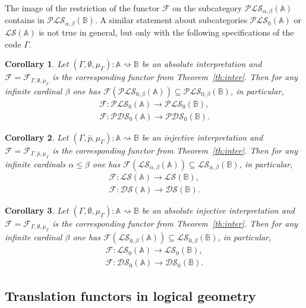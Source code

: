 \documentclass[12pt]{article}
\newtheorem{corollary}{Corollary}
\theoremstyle{definition}
\def\MA{{\mathbb{A}}}
\def\MB{{\mathbb{B}}}
\def\F{{\mathcal{F}}}
\def\PLS{{\mathcal{PLS}}}
\def\PDS{{\mathcal{PDS}}}
\def\DS{{\mathcal{DS}}}
\def\LS{{\mathcal{LS}}}
\begin{document}
The image of the restriction of the functor $\F$ on the subcategory $\PLS_{\alpha,\beta}(\MA)$ contains in $\PLS_{\alpha,\beta}(\MB)$. A similar statement about subcategories $\PLS_0(\MA)$ or $\LS(\MA)$ is not true in general, but only with the following specifications of the code $\Gamma$.

\begin{corollary}\label{cor:abs}
Let $(\Gamma,\emptyset,\mu_\Gamma)\colon\MA\rightsquigarrow\MB$ be an absolute interpretation and $\F=\F_{\Gamma,\emptyset,\mu_\Gamma}$ is the corresponding functor from Theorem~\ref{th:inter}. Then for any infinite cardinal $\beta$ one has $\F(\PLS_{0,\beta}(\MA))\subseteq \PLS_{0,\beta}(\MB)$, in particular,
\begin{gather*}
\F\colon\PLS_0(\MA)\to\PLS_0(\MB),\\
\F\colon\PDS_0(\MA)\to\PDS_0(\MB).
\end{gather*}
\end{corollary}

\begin{corollary}\label{cor:inj}
Let $(\Gamma,\bar p,\mu_\Gamma)\colon\MA\rightsquigarrow\MB$ be an injective interpretation and $\F=\F_{\Gamma,\bar p,\mu_\Gamma}$ is the corresponding functor from Theorem~\ref{th:inter}. Then for any infinite cardinals $\alpha\leqslant\beta$ one has $\F(\LS_{\alpha,\beta}(\MA))\subseteq \LS_{\alpha,\beta}(\MB)$, in particular,
\begin{gather*}
\F\colon\LS(\MA)\to\LS(\MB),\\
\F\colon\DS(\MA)\to\DS(\MB).
\end{gather*}
\end{corollary}

\begin{corollary}
Let $(\Gamma,\emptyset,\mu_\Gamma)\colon\MA\rightsquigarrow\MB$ be an absolute injective interpretation and $\F=\F_{\Gamma,\emptyset,\mu_\Gamma}$ is the corresponding functor from Theorem~\ref{th:inter}. Then for any infinite cardinal $\beta$ one has $\F(\LS_{0,\beta}(\MA))\subseteq \LS_{0,\beta}(\MB)$, in particular,
\begin{gather*}
\F\colon\LS_0(\MA)\to\LS_0(\MB),\\
\F\colon\DS_0(\MA)\to\DS_0(\MB).
\end{gather*}
\end{corollary}

\subsection{Translation functors in logical geometry}\label{subsec:functor}
\end{document}
